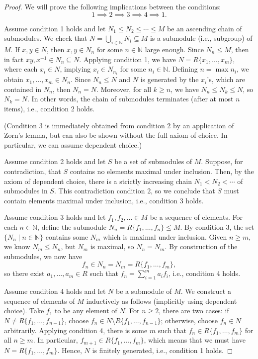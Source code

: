 \documentclass[12pt]{article}
\newcommand{\N}{\mathbb{N}}
\newcommand{\<}{\langle}
\renewcommand{\>}{\rangle}
\begin{document}
\begin{proof}
    We will prove the following implications between the conditions:
    \[
        1 \implies 2 \implies 3 \implies 4 \implies 1.
    \]

    Assume condition 1 holds and let $N_1 \leq N_2 \leq \cdots \leq M$ be an ascending chain of submodules. We check that $N = \bigcup_{i \in \N} N_i \subseteq M$ is a submodule (i.e., subgroup) of $M$. If $x, y \in N$, then $x, y \in N_n$ for some $n \in \N$ large enough. Since $N_n \leq M$, then in fact $xy, x^{-1} \in N_n \subseteq N$. Applying condition 1, we have $N = R\{x_1, \dots, x_m\}$, where each $x_i \in N$, implying $x_i \in N_{n_i}$ for some $n_i \in \N$. Defining $n = \max n_i$, we obtain $x_1, \dots, x_m \in N_n$. Since $N_n \leq N$ and $N$ is generated by the $x_i$'s, which are contained in $N_n$, then $N_n = N$. Moreover, for all $k \geq n$, we have $N_n \leq N_k \leq N$, so $N_k = N$. In other words, the chain of submodules terminates (after at most $n$ items), i.e., condition 2 holds.

    (Condition 3 is immediately obtained from condition 2 by an application of Zorn's lemma, but can also be shown without the full axiom of choice. In particular, we can assume dependent choice.)

    Assume condition 2 holds and let $S$ be a set of submodules of $M$. Suppose, for contradiction, that $S$ contains no elements maximal under inclusion. Then, by the axiom of dependent choice, there is a strictly increasing chain $N_1 < N_2 < \cdots $ of submodules in $S$. This contradiction condition 2, so we conclude that $S$ must contain elements maximal under inclusion, i.e., condition 3 holds.

    Assume condition 3 holds and let $f_1, f_2, \ldots \in M$ be a sequence of elements. For each $n \in \N$, define the submodule $N_n = R\{f_1, \dots, f_n\} \leq M$. By condition 3, the set $\{N_n \mid n \in \N\}$ contains some $N_m$ which is maximal under inclusion. Given $n \geq m$, we know $N_m \leq N_n$, but $N_m$ is maximal, so $N_n = N_m$. By construction of the submodules, we now have
    \[
        f_n \in N_n = N_m = R\{f_1, \dots, f_m\},
    \]
    so there exist $a_1, \dots, a_m \in R$ such that $f_n = \sum_{i=1}^{m} a_if_i$, i.e., condition 4 holds.

    Assume condition 4 holds and let $N$ be a submodule of $M$. We construct a sequence of elements of $M$ inductively as follows (implicitly using dependent choice). Take $f_1$ to be any element of $N$. For $n \geq 2$, there are two cases: if $N \ne R\{f_1, \dots, f_{n-1}\}$, choose $f_n \in N \setminus R\{f_1, \dots, f_{n-1}\}$; otherwise, choose $f_n \in N$ arbitrarily. Applying condition 4, there is some $m$ such that $f_n \in R\{f_1, \dots, f_m\}$ for all $n \geq m$. In particular, $f_{m+1} \in R\{f_1, \dots, f_m\}$, which means that we must have $N = R\{f_1, \dots, f_m\}$. Hence, $N$ is finitely generated, i.e., condition 1 holds.

\end{proof}
\end{document}
